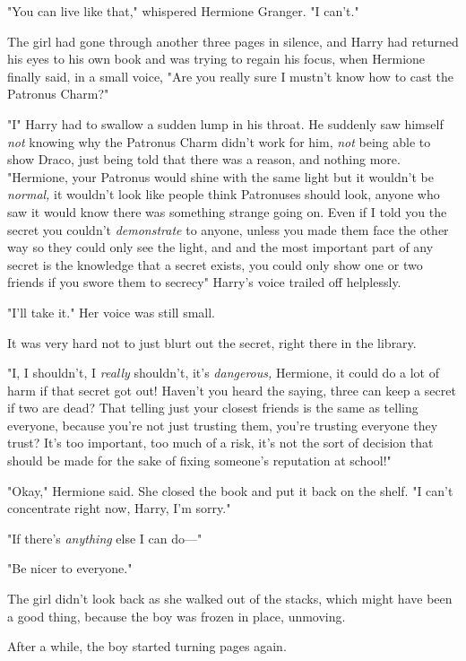"You can live like that," whispered Hermione Granger. "I can't."

The girl had gone through another three pages in silence, and Harry had
returned his eyes to his own book and was trying to regain his focus, when
Hermione finally said, in a small voice, "Are you really sure I mustn't know
how to cast the Patronus Charm?"

"I{\el}" Harry had to swallow a sudden lump in his throat. He suddenly saw
himself \emph{not} knowing why the Patronus Charm didn't work for him,
\emph{not} being able to show Draco, just being told that there was a reason,
and nothing more. "Hermione, your Patronus would shine with the same light but
it wouldn't be \emph{normal,} it wouldn't look like people think Patronuses
should look, anyone who saw it would know there was something strange going on.
Even if I told you the secret you couldn't \emph{demonstrate} to anyone, unless
you made them face the other way so they could only see the light, and{\el}
and the most important part of any secret is the knowledge that a secret
exists, you could only show one or two friends if you swore them to
secrecy{\el}" Harry's voice trailed off helplessly.

"I'll take it." Her voice was still small.

It was very hard not to just blurt out the secret, right there in the library.

"I, I shouldn't, I \emph{really} shouldn't, it's \emph{dangerous,} Hermione, it
could do a lot of harm if that secret got out! Haven't you heard the saying,
three can keep a secret if two are dead? That telling just your closest friends
is the same as telling everyone, because you're not just trusting them, you're
trusting everyone they trust? It's too important, too much of a risk, it's not
the sort of decision that should be made for the sake of fixing someone's
reputation at school!"

"Okay," Hermione said. She closed the book and put it back on the shelf. "I
can't concentrate right now, Harry, I'm sorry."

"If there's \emph{anything} else I can do\mbox{---}"

"Be nicer to everyone."

The girl didn't look back as she walked out of the stacks, which might have
been a good thing, because the boy was frozen in place, unmoving.

After a while, the boy started turning pages again.

